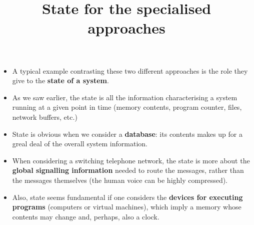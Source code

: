 \documentclass[wide]{slides}
\begin{document}
\begin{slide}
  \title{State for the specialised approaches}

  \begin{itemize}
    \item A typical example contrasting these two different approaches
      is the role they give to the \textbf{state of a system}.

    \item As we saw earlier, the state is all the information
      characterising a system running at a given point in time (memory
      contents, program counter, files, network buffers, etc.)

    \item State is obvious when we consider a \textbf{database}: its
      contents makes up for a greal deal of the overall system
      information.

    \item When considering a switching telephone network, the state is
      more about the \textbf{global signalling information} needed to
      route the messages, rather than the messages themselves (the
      human voice can be highly compressed).

    \item Also, state seems fundamental if one considers the
      \textbf{devices for executing programs} (computers or virtual
      machines), which imply a memory whose contents may change and,
      perhaps, also a clock.

\end{itemize}

\end{slide}
\end{document}
